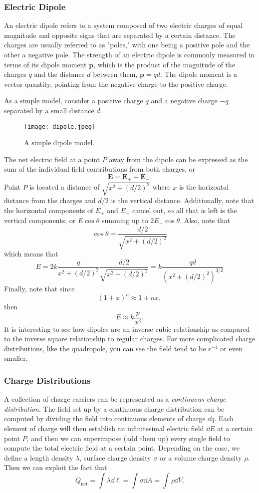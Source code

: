 \documentclass[12pt]{article}
\let\vec\mathbf
\begin{document}
  \subsubsection{Electric Dipole}
  An electric dipole refers to a system composed of two electric charges of equal magnitude and opposite signs that are separated by a certain distance. The charges are usually referred to as "poles," with one being a positive pole and the other a negative pole. The strength of an electric dipole is commonly measured in terms of its dipole moment $\vec p$, which is the product of the magnitude of the charges $q$ and the distance $d$ between them, $\vec p = qd$. The dipole moment is a vector quantity, pointing from the negative charge to the positive charge.

  As a simple model, consider a positive charge $q$ and a negative charge $-q$ separated by a small distance $d$. 
              \begin{figure}[H]
  \centering
      \texttt{[image: dipole.jpeg]}
      \caption{A simple dipole model.}
  \end{figure}
  The net electric field at a point $P$ away from the dipole can be expressed as the sum of the individual field contributions from both charges, or
  \[\vec E = \vec E_{+} + \vec E_{-}.\]
  Point $P$ is located a distance of $\sqrt{x^2 + (d/2)^2}$ where $x$ is the horizontal distance from the charges and $d/2$ is the vertical distance. Additionally, note that the horizontal components of $E_{+}$ and $E_{-}$ cancel out, so all that is left is the vertical components, or $E\cos\theta$ summing up to $2E_{+}\cos\theta$. Also, note that 
  \[\cos\theta = \frac{d/2}{\sqrt{x^2 + (d/2)^2}}\]
  which means that 
  \[E = 2 k\frac{q}{x^2 + (d/2)^2} \frac{d/2}{\sqrt{x^2 + (d/2)^2}} = k \frac{qd}{(x^2 + (d/2)^2)^{3/2}}\]
  Finally, note that since 
  \[(1 + x)^n \approx 1 + nx,\]
  then 
  \[E \approx k \frac{p}{x^3}.\]
  It is interesting to see how dipoles are an inverse cubic relationship as compared to the inverse square relationship to regular charges. For more complicated charge distributions, like the quadropole, you can see the field tend to be $r^{-4}$ or even smaller. 
  \subsubsection{Charge Distributions}
  A collection of charge carriers can be represented as a \textit{continuous charge distribution}. The field set up by a continuous charge distribution can be computed by dividing the field into continuous elements of charge $\dd q$. Each element of charge will then establish an infinitesimal electric field $\dd E$ at a certain point $P$, and then we can superimpose (add them up) every single field to compute the total electric field at a certain point. Depending on the case, we define a length density $\lambda$, surface charge density $\sigma$ or a volume charge density $\rho$. Then we can exploit the fact that 
$$Q_{\text{net}}=\int\lambda\dd\ell=\int\sigma\dd A=\int\rho\dd V.$$
\end{document}
